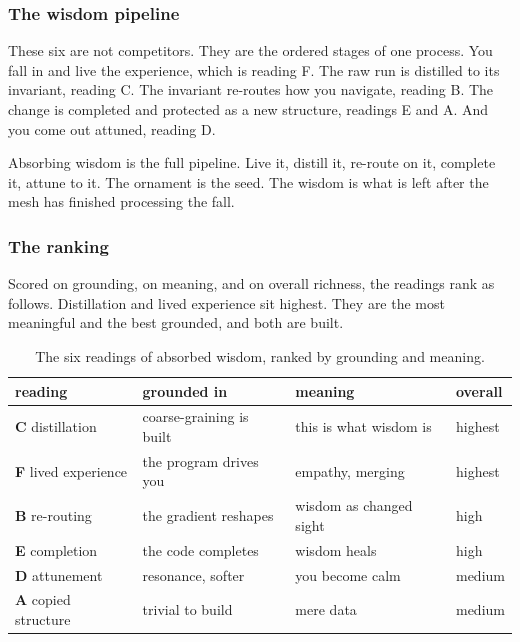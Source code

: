 \subsubsection{The wisdom pipeline}

These six are not competitors. They are the ordered stages of one process. You fall in and live the experience, which is reading F. The raw run is distilled to its invariant, reading C. The invariant re-routes how you navigate, reading B. The change is completed and protected as a new structure, readings E and A. And you come out attuned, reading D.

\begin{principle}
Absorbing wisdom is the full pipeline. Live it, distill it, re-route on it, complete it, attune to it. The ornament is the seed. The wisdom is what is left after the mesh has finished processing the fall.
\end{principle}

\subsubsection{The ranking}

Scored on grounding, on meaning, and on overall richness, the readings rank as follows. Distillation and lived experience sit highest. They are the most meaningful and the best grounded, and both are built.

\begin{table}[ht]
\centering
\begin{tabular}{@{}llll@{}}
\toprule
reading & grounded in & meaning & overall \\
\midrule
\textbf{C} distillation & coarse-graining is built & this is what wisdom is & highest \\
\textbf{F} lived experience & the program drives you & empathy, merging & highest \\
\textbf{B} re-routing & the gradient reshapes & wisdom as changed sight & high \\
\textbf{E} completion & the code completes & wisdom heals & high \\
\textbf{D} attunement & resonance, softer & you become calm & medium \\
\textbf{A} copied structure & trivial to build & mere data & medium \\
\bottomrule
\end{tabular}
\caption{The six readings of absorbed wisdom, ranked by grounding and meaning.}
\label{tab:wisdom-readings}
\end{table}

